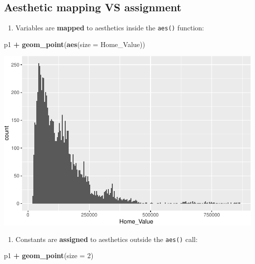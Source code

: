 \documentclass[
]{book}
\newenvironment{Shaded}{\begin{snugshade}}{\end{snugshade}}
\newcommand{\DataTypeTok}[1]{\textcolor[rgb]{0.13,0.29,0.53}{#1}}
\newcommand{\DecValTok}[1]{\textcolor[rgb]{0.00,0.00,0.81}{#1}}
\newcommand{\KeywordTok}[1]{\textcolor[rgb]{0.13,0.29,0.53}{\textbf{#1}}}
\newcommand{\NormalTok}[1]{#1}
\newcommand{\OperatorTok}[1]{\textcolor[rgb]{0.81,0.36,0.00}{\textbf{#1}}}
\newcommand{\StringTok}[1]{\textcolor[rgb]{0.31,0.60,0.02}{#1}}
\providecommand{\tightlist}{%
  \setlength{\itemsep}{0pt}\setlength{\parskip}{0pt}}
\begin{document}
\hypertarget{aesthetic-mapping-vs-assignment}{%
\subsection{Aesthetic mapping VS assignment}\label{aesthetic-mapping-vs-assignment}}

\begin{enumerate}
\def\labelenumi{\arabic{enumi}.}
\tightlist
\item
  Variables are \textbf{mapped} to aesthetics inside the \texttt{aes()} function:
\end{enumerate}

\begin{Shaded}
\begin{Highlighting}[]
\NormalTok{p1 }\OperatorTok{+}
\StringTok{  }\KeywordTok{geom\_point}\NormalTok{(}\KeywordTok{aes}\NormalTok{(}\DataTypeTok{size =}\NormalTok{ Home\_Value))}
\end{Highlighting}
\end{Shaded}

\includegraphics{R/Rgraphics/figures/unnamed-chunk-161-1.pdf}

\begin{enumerate}
\def\labelenumi{\arabic{enumi}.}
\setcounter{enumi}{1}
\tightlist
\item
  Constants are \textbf{assigned} to aesthetics outside the \texttt{aes()} call:
\end{enumerate}

\begin{Shaded}
\begin{Highlighting}[]
\NormalTok{p1 }\OperatorTok{+}
\StringTok{  }\KeywordTok{geom\_point}\NormalTok{(}\DataTypeTok{size =} \DecValTok{2}\NormalTok{)}
\end{Highlighting}
\end{Shaded}
\end{document}
